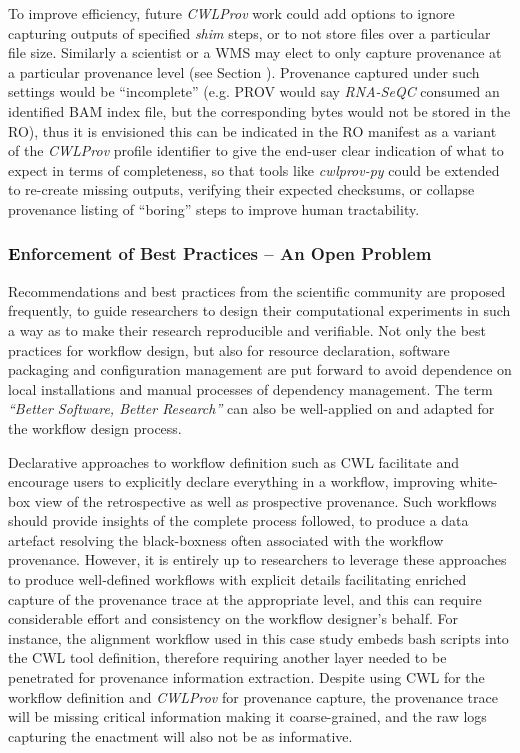 \documentclass[a4paper,num-refs]{oup-contemporary}
\begin{document}
 To improve efficiency, future \textit{CWLProv} work could add options to ignore capturing outputs of specified \textit{shim} steps, or to not store files over a particular file size. Similarly a scientist or a WMS may elect to only capture provenance at a particular provenance level (see Section \textbf{}). 
 Provenance captured under such settings would be ``incomplete'' (e.g. PROV would say \textit{RNA-SeQC} consumed an identified BAM index file, but the corresponding bytes would not be stored in the RO), thus it is envisioned this can be indicated in the RO manifest as a variant of the \textit{CWLProv} profile identifier to give the end-user clear indication of what to expect in terms of completeness, so that tools like \textit{cwlprov-py} could be extended to re-create missing outputs, verifying their expected checksums, or collapse provenance listing of ``boring'' steps to improve human tractability.

\subsubsection{\textcolor{black} Enforcement of Best Practices -- An Open Problem}
Recommendations and best practices from the scientific community are proposed frequently, to guide researchers to design their computational experiments in such a way as to make their research reproducible and verifiable. Not only the best practices for workflow design, but also for resource declaration, software packaging and configuration management are put forward \citep{Gruening2018} to avoid dependence on local installations and manual processes of dependency management. The term \textit{``Better Software, Better Research''} \citep{Goble2014} can also be well-applied on and adapted for the workflow design process. 

Declarative approaches to workflow definition such as CWL facilitate and encourage users to explicitly declare everything in a workflow, improving white-box view of the retrospective as well as prospective provenance. Such workflows should provide insights of the complete process followed, to produce a data artefact resolving the black-boxness often associated with the workflow provenance. However, it is entirely up to researchers to leverage these approaches to produce well-defined workflows with explicit details facilitating enriched capture of the provenance trace at the appropriate level, and this can require considerable effort and consistency on the workflow designer's behalf. For instance, the alignment workflow used in this case study embeds bash scripts into the CWL tool definition, therefore requiring another layer needed to be penetrated for provenance information extraction. Despite using CWL for the workflow definition and \textit{CWLProv} for provenance capture, the provenance trace will be missing critical information making it coarse-grained, and the raw logs capturing the enactment will also not be as informative. 
\end{document}
